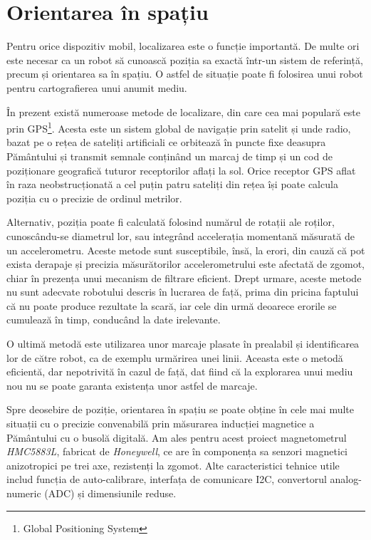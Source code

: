 \section{Orientarea în spațiu}

Pentru orice dispozitiv mobil, localizarea este o funcție importantă. De multe ori este necesar ca un robot să cunoască poziția sa exactă într-un sistem de referință, precum și orientarea sa în spațiu. O astfel de situație poate fi folosirea unui robot pentru cartografierea unui anumit mediu. 

În prezent există numeroase metode de localizare, din care cea mai populară este prin GPS\footnote{Global Positioning System}. Acesta este un sistem global de navigație prin satelit și unde radio, bazat pe o rețea de sateliți artificiali ce orbitează în puncte fixe deasupra Pământului și transmit semnale conținând un marcaj de timp și un cod de poziționare geografică tuturor receptorilor aflați la sol. Orice receptor GPS aflat în raza neobstrucționată a cel puțin patru sateliți din rețea își poate calcula poziția cu o precizie de ordinul metrilor.

Alternativ, poziția poate fi calculată folosind numărul de rotații ale roților, cunoscându-se diametrul lor, sau integrând accelerația momentană măsurată de un accelerometru. Aceste metode sunt susceptibile, însă, la erori, din cauză că pot exista derapaje și precizia măsurătorilor accelerometrului este afectată de zgomot, chiar în prezența unui mecanism de filtrare eficient. Drept urmare, aceste metode nu sunt adecvate robotului descris în lucrarea de față, prima din pricina faptului că nu poate produce rezultate la scară, iar cele din urmă deoarece erorile se cumulează în timp, conducând la date irelevante.

O ultimă metodă este utilizarea unor marcaje plasate în prealabil și identificarea lor de către robot, ca de exemplu urmărirea unei linii. Aceasta este o metodă eficientă, dar nepotrivită în cazul de față, dat fiind că la explorarea unui mediu nou nu se poate garanta existența unor astfel de marcaje.

Spre deosebire de poziție, orientarea în spațiu se poate obține în cele mai multe situații cu o precizie convenabilă prin măsurarea inducției magnetice a Pământului cu o busolă digitală. Am ales pentru acest proiect magnetometrul \textit{HMC5883L}, fabricat de \textit{Honeywell}, ce are în componența sa senzori magnetici anizotropici pe trei axe, rezistenți la zgomot. Alte caracteristici tehnice utile includ funcția de auto-calibrare, interfața de comunicare I2C, convertorul analog-numeric (ADC) și dimensiunile reduse.


